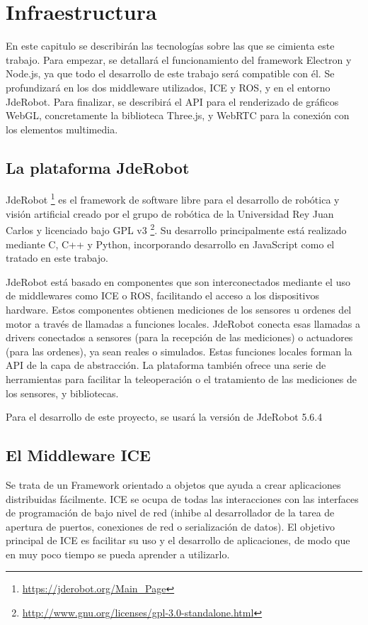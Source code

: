 \chapter{Infraestructura}\label{cap.infraestructura}
En este capitulo se describirán las tecnologías sobre las que se cimienta este trabajo. Para empezar, se detallará el funcionamiento del framework Electron y Node.js, ya que todo el desarrollo de este trabajo será compatible con él. Se profundizará en los dos middleware utilizados, ICE y ROS, y en el entorno JdeRobot. Para finalizar, se describirá el API para el renderizado de gráficos WebGL, concretamente la biblioteca Three.js, y WebRTC para la conexión con los elementos multimedia.

\section{La plataforma JdeRobot}
JdeRobot \footnote{\url{https://jderobot.org/Main_Page}} es el framework de software libre para el desarrollo de robótica y visión artificial creado por el grupo de robótica de la Universidad Rey Juan Carlos y licenciado bajo GPL v3 \footnote{\url{http://www.gnu.org/licenses/gpl-3.0-standalone.html}}. Su desarrollo principalmente está realizado mediante C, C++ y Python, incorporando desarrollo en JavaScript como el tratado en este trabajo.

JdeRobot está basado en componentes que son interconectados mediante el uso de middlewares como ICE o ROS, facilitando el acceso a los dispositivos hardware. Estos componentes obtienen mediciones  de los sensores u ordenes del motor a través de llamadas a funciones locales. JdeRobot conecta esas llamadas a drivers conectados a sensores (para la recepción de las mediciones) o actuadores (para las ordenes), ya sean reales o simulados. Estas funciones locales forman la API de la capa de abstracción. La plataforma también ofrece una serie de herramientas para facilitar la teleoperación o el tratamiento de las mediciones de los sensores, y bibliotecas.

Para el desarrollo de este proyecto, se usará la versión de JdeRobot 5.6.4

\section{El Middleware ICE}
Se trata de un Framework orientado a objetos que ayuda a crear aplicaciones distribuidas fácilmente. ICE se ocupa de todas las interacciones con las interfaces de programación de bajo nivel de red (inhibe al desarrollador de la tarea de apertura de puertos, conexiones de red o serialización de datos). El objetivo principal de ICE es facilitar su uso y el desarrollo de aplicaciones, de modo que en muy poco tiempo se pueda aprender a utilizarlo.

